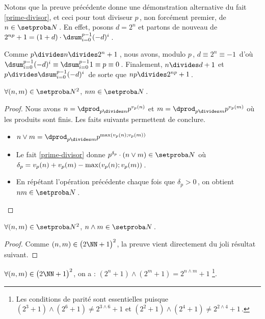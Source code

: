 Notons que la preuve précédente donne une démonstration alternative du fait \ref{prime-divisor}, et ceci pour tout diviseur $p$\,, non forcément premier, de $n \in \ourset$\,.
En effet,
posons $d = 2^n$ et partons de nouveau de $2^{np} + 1 = (1 + d) \cdot \dsum_{i=0}^{p-1} (-d)^i$\,.

Comme $p \divides n \divides 2^n + 1$\,, nous avons, modulo $p$\,, $d \equiv 2^n \equiv - 1 $\, d'où 
$\dsum_{i=0}^{p-1} (-d)^i \equiv \dsum_{i=0}^{p-1} 1 \equiv p \equiv 0$\,.
%
Finalement,
$n \divides d + 1$ et $p \divides \dsum_{i=0}^{p-1} (-d)^i$\, de sorte que $n p \divides 2^{n p} + 1$\,.




\begin{fact} \label{product}
	$\forall (n , m) \in \ourset^2$, $n m \in \ourset$\,.
\end{fact}

\begin{proof}
	Nous avons
	$n = \dprod_{p \divides n} p^{\padicval{n}}$
	et
	$m = \dprod_{p \divides m} p^{\padicval{m}}$
	où les produits sont finis.
	Les faits suivants permettent de conclure.

	\begin{itemize}
		\item $n \vee m = \dprod_{p \divides m} p^{\max ( \padicval{n} ; \padicval{m} )}$

		\item Le fait \ref{prime-divisor} donne $p^{\delta_p} \cdot ( n \vee m ) \in \ourset$ où $\delta_p = \padicval{n} + \padicval{m} - \max ( \padicval{n} ; \padicval{m} )$\,.

		\item En répétant l'opération précédente chaque fois que $\delta_p > 0$\,, on obtient $n m \in \ourset$\,.
	\end{itemize}
\end{proof}




\begin{fact} \label{gcd}
	$\forall (n , m) \in \ourset^2$, $n \wedge m \in \ourset$\,.
\end{fact}

\begin{proof}
	Comme $(n , m) \in \big( 2 \NN + 1 \big)^2$, la preuve vient directement du joli résultat suivant.
\end{proof}




\begin{fact}
	$\forall (n , m) \in \big( 2 \NN + 1 \big)^2$, on a :
	$(2^n + 1) \wedge (2^m + 1) = 2^{n \wedge m} + 1$
	\footnote{
		Les conditions de parité sont essentielles puisque
		$(2^3 + 1) \wedge (2^6 + 1) \neq 2^{3 \wedge 6} + 1$
		et
		$(2^2 + 1) \wedge (2^4 + 1) \neq 2^{2 \wedge 4} + 1$\,.
	}.
\end{fact}

